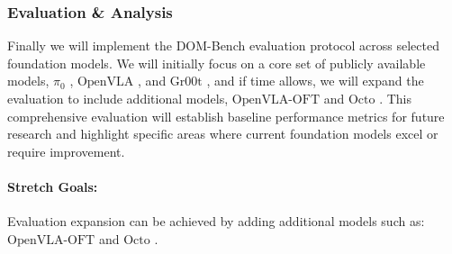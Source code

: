 
\subsubsection{Evaluation \& Analysis}
Finally we will implement the DOM-Bench evaluation protocol across selected foundation models.
We will initially focus on a core set of publicly available models, $\pi_0$ \cite{pi_zero}, $\text{OpenVLA}$ \cite{OpenVLA}, and $\text{Gr00t}$ \cite{Gr00tN1}, and if time allows, we will expand the evaluation to include additional models, $\text{OpenVLA-OFT}$ \cite{OpenVLA-OFT} and $\text{Octo}$ \cite{Octo}.
This comprehensive evaluation will establish baseline performance metrics for future research and
highlight specific areas where current foundation models excel or require improvement.

\paragraph{Stretch Goals:}

Evaluation expansion can be achieved by adding additional models such as: $\text{OpenVLA-OFT}$ \cite{OpenVLA-OFT} and $\text{Octo}$ \cite{Octo}.

